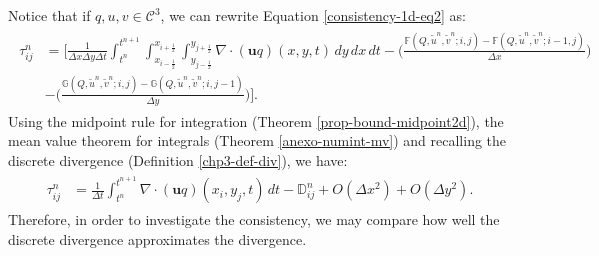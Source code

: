 Notice that if $q,u, v \in \mathcal{C}^3$, we can rewrite Equation \eqref{consistency-1d-eq2} as:
\begin{align*}
	\begin{split}
		\tau_{ij}^n &= 
		\bigg[ \frac{1}{\Delta x \Delta y \Delta t}  \int_{t^{n}}^{t^{n+1}}\int_{x_{i-\frac{1}{2}}}^{x_{i+\frac{1}{2}}} 
		\int_{y_{j-\frac{1}{2}}}^{y_{j+\frac{1}{2}}} {\nabla \cdot (\boldsymbol{u}q)}(x, y, t) \,dy \,dx \,dt 
		-\bigg( \frac{\mathbb{F}(Q,\tilde{u}^n,\tilde{v}^n;i,j) - \mathbb{F}(Q,\tilde{u}^n,\tilde{v}^n;i-1,j)}{\Delta x} \bigg) \\
		&-\bigg( \frac{\mathbb{G}(Q,\tilde{u}^n,\tilde{v}^n;i,j) - \mathbb{G}(Q,\tilde{u}^n,\tilde{v}^n;i,j-1)}{\Delta y} \bigg)
		\bigg].
	\end{split}
\end{align*}
Using the midpoint rule for integration (Theorem \ref{prop-bound-midpoint2d}), the mean value theorem for integrals
(Theorem \ref{anexo-numint-mv}) and recalling the discrete divergence (Definition \ref{chp3-def-div}), we have:
\begin{align}
	\begin{split}
		\label{consistency-2d-eq}
		\tau_{ij}^n 
		&= \frac{1}{\Delta t}  \int_{t^{n}}^{t^{n+1}}
		{\nabla \cdot (\boldsymbol{u}q)}(x_i, y_j, t)  \,dt - 
		\mathbb{D}^n_{ij} + O(\Delta x^2) + O(\Delta y^2).
	\end{split}
\end{align}
Therefore, in order to investigate the consistency, we may compare how well the discrete divergence approximates the divergence.
